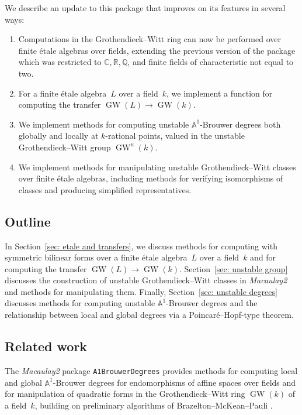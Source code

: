 \documentclass[12pt]{amsart}
\theoremstyle{definition}
\DeclareMathOperator{\GW}{GW}
\begin{document}
We describe an update to this package that improves on its features in several ways: 
\begin{enumerate}
    \item Computations in the Grothendieck--Witt ring can now be performed over finite \'{e}tale algebras over fields, extending the previous version of the package which was restricted to $\mathbb{C},\mathbb{R},\mathbb{Q}$, and finite fields of characteristic not equal to two. 
    \item For a finite \'{e}tale algebra~$L$ over a field~$k$, we implement a function for computing the transfer $\GW(L)\to\GW(k)$. 
    \item We implement methods for computing unstable $\mathbb{A}^{1}$-Brouwer degrees both globally and locally at $k$-rational points, valued in the unstable Grothendieck--Witt group $\GW^{u}(k)$. 
    \item We implement methods for manipulating unstable Grothendieck--Witt classes over finite \'{e}tale algebras, including methods for verifying isomorphisms of classes and producing simplified representatives.  
\end{enumerate}

\subsection{Outline}\label{subsec: outline}
In Section~\ref{sec: etale and transfers}, we discuss methods for computing with symmetric bilinear forms over a finite \'{e}tale algebra~$L$ over a field~$k$ and for computing the transfer $\GW(L)\to\GW(k)$. Section~\ref{sec: unstable group} discusses the construction of unstable Grothendieck--Witt classes in \emph{Macaulay2} and methods for manipulating them. Finally, Section~\ref{sec: unstable degrees} discusses methods for computing unstable $\mathbb{A}^{1}$-Brouwer degrees and the relationship between local and global degrees via a Poincar\'{e}--Hopf-type theorem.

\subsection{Related work}\label{subsec: related work}
The \emph{Macaulay2} package \texttt{A1BrouwerDegrees} \cite{A1BrouwerDegreesSource,A1BrouwerDegreesArticle} provides methods for computing local and global $\mathbb{A}^{1}$-Brouwer degrees for endomorphisms of affine spaces over fields and for manipulation of quadratic forms in the Grothendieck--Witt ring $\GW(k)$ of a field~$k$, building on preliminary algorithms of Brazelton--McKean--Pauli \cite{BMPCode,BMP}. 
\end{document}
